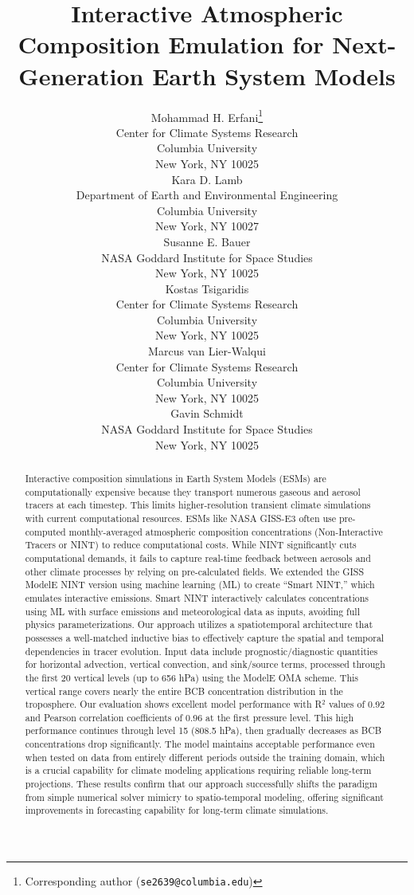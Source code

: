 \documentclass{article}
\title{Interactive Atmospheric Composition Emulation for Next-Generation Earth System Models}
\author{%
    Mohammad H. Erfani\thanks{Corresponding author (\texttt{se2639@columbia.edu})} \\
    Center for Climate Systems Research\\
    Columbia University\\
    New York, NY 10025 \\
    \And
    Kara D. Lamb \\
    Department of Earth and Environmental Engineering \\
    Columbia University \\
    New York, NY 10027\\
    \And
    Susanne E. Bauer \\
    NASA Goddard Institute for Space Studies\\
    New York, NY 10025 \\
    \And
    Kostas Tsigaridis \\
    Center for Climate Systems Research\\
    Columbia University\\
    New York, NY 10025 \\
    \And
    Marcus van Lier-Walqui\\
    Center for Climate Systems Research\\
    Columbia University\\
    New York, NY 10025\\
    \And
    Gavin Schmidt\\
    NASA Goddard Institute for Space Studies\\
    New York, NY 10025 \\
}
\begin{document}
\maketitle

\begin{abstract}
    Interactive composition simulations in Earth System Models (ESMs) are computationally expensive because they transport numerous gaseous and aerosol tracers at each timestep. This limits higher-resolution transient climate simulations with current computational resources. ESMs like NASA GISS-E3 often use pre-computed monthly-averaged atmospheric composition concentrations (Non-Interactive Tracers or NINT) to reduce computational costs. While NINT significantly cuts computational demands, it fails to capture real-time feedback between aerosols and other climate processes by relying on pre-calculated fields. We extended the GISS ModelE NINT version using machine learning (ML) to create ``Smart NINT,'' which emulates interactive emissions. Smart NINT interactively calculates concentrations using ML with surface emissions and meteorological data as inputs, avoiding full physics parameterizations. Our approach utilizes a spatiotemporal architecture that possesses a well-matched inductive bias to effectively capture the spatial and temporal dependencies in tracer evolution. Input data include prognostic/diagnostic quantities for horizontal advection, vertical convection, and sink/source terms, processed through the first 20 vertical levels (up to 656 hPa) using the ModelE OMA scheme. This vertical range covers nearly the entire BCB concentration distribution in the troposphere. Our evaluation shows excellent model performance with R$^2$ values of 0.92 and Pearson correlation coefficients of 0.96 at the first pressure level. This high performance continues through level 15 (808.5 hPa), then gradually decreases as BCB concentrations drop significantly. The model maintains acceptable performance even when tested on data from entirely different periods outside the training domain, which is a crucial capability for climate modeling applications requiring reliable long-term projections. These results confirm that our approach successfully shifts the paradigm from simple numerical solver mimicry to spatio-temporal modeling, offering significant improvements in forecasting capability for long-term climate simulations.
\end{abstract}
\end{document}
